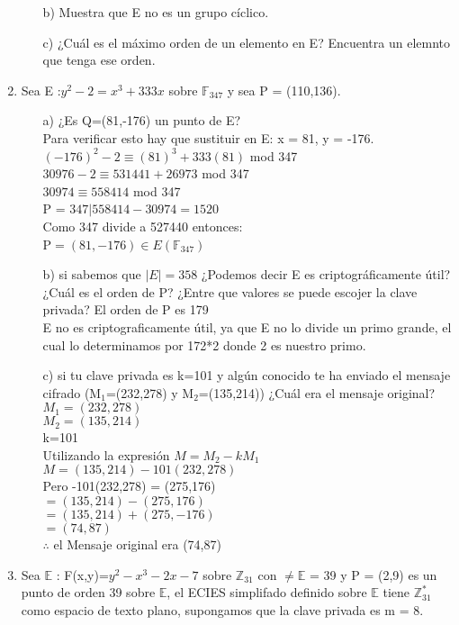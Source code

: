 \documentclass[11pt,letterpaper]{article}
\newcounter{neq}
\begin{document}
\begin{enumerate}
\begin{itemize}
\item[b)] Muestra que E no es un grupo cíclico.
\item[c)] ¿Cuál es el máximo orden de un elemento en E? Encuentra un elemnto que tenga ese orden.
\end{itemize}
\item Sea E :$y^{2}-2=x^{3}+333x$ sobre $\mathbb{F}_{347}$ y sea P = (110,136).
\begin{itemize}
\item[a)] ¿Es Q=(81,-176) un punto de E?\\
Para verificar esto hay que sustituir en E: x = 81, y = -176.\\
$(-176)^2 -2 \equiv (81)^3 +333(81)$ mod 347\\
$30976-2 \equiv 531441+26973$ mod 347\\
$30974 \equiv 558414$ mod 347\\
P = $347 | 558414 -30974 = 1520$\\
Como 347 divide a 527440 entonces:\\
P$=(81,-176) \in E(\mathbb{F}_347)$
\item[b)] si sabemos que $|E| = 358$ ¿Podemos decir E es criptográficamente útil?
¿Cuál es el orden de P? ¿Entre que valores se puede escojer la clave privada?
El orden de P es 179\\
E no es criptograficamente útil, ya que E no lo divide un primo grande, el cual lo determinamos por 172*2 donde 2 es nuestro primo.
\item[c)] si tu clave privada es k=101 y algún conocido te ha enviado el mensaje cifrado (M$_1$=(232,278) y M$_2$=(135,214)) ¿Cuál era el mensaje original?\\
$M_1=(232,278)$\\
$M_2=(135,214)$\\
k=101\\
Utilizando la expresión $M=M_2 - kM_1$\\
$M=(135,214)-101(232,278)$\\
Pero  -101(232,278) = (275,176)\\
$=(135,214)-(275,176)$\\
$=(135,214)+(275,-176)$\\
$=(74,87)$\\
$\therefore$ el Mensaje original era (74,87)\\
\end{itemize}
\item Sea $\mathbb{E}$ : F(x,y)=$y^{2}-x^{3}-2x-7$ sobre $\mathbb{Z}_{31}$ con $\neq \mathbb{E}$ = 39 y P = (2,9) es un punto de orden 39 sobre $\mathbb{E}$, el ECIES simplifado definido sobre $\mathbb{E}$ tiene $\mathbb{Z}^{*}_{31}$ como espacio de texto plano, supongamos que la clave privada es m = 8.

\end{enumerate}
\end{document}
